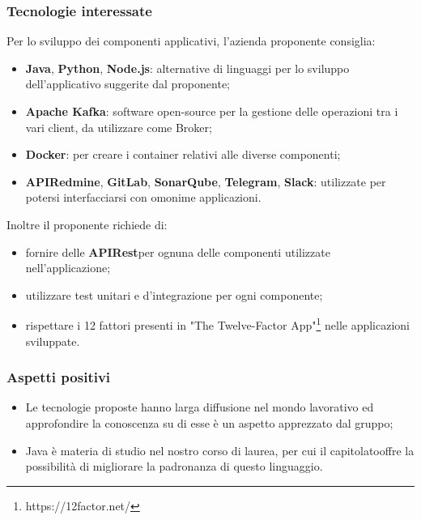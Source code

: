 \subsubsection{Tecnologie interessate}
Per lo sviluppo dei componenti applicativi, l'azienda proponente consiglia:
\begin{itemize}
	\item \textbf{Java}, \textbf{Python}\glo, \textbf{Node.js}\glo: alternative di linguaggi per lo sviluppo dell'applicativo suggerite dal proponente; 
	\item\textbf{Apache Kafka}\glo : software open-source per la gestione delle operazioni tra i vari client, da utilizzare come Broker;
	\item \textbf{Docker}\glo: per creare i container relativi alle diverse componenti;
	\item \textbf{API\glosp Redmine}\glo,  \textbf{GitLab}\glo,  \textbf{SonarQube}\glo,  \textbf{Telegram}\glo, \textbf{Slack}\glo: utilizzate per potersi interfacciarsi con omonime applicazioni.
\end{itemize}
Inoltre il proponente richiede di:
\begin{itemize}
	\item fornire delle \textbf{API\glosp Rest}\glosp per ognuna delle componenti utilizzate nell'applicazione; 
	\item utilizzare test unitari e d'integrazione per ogni componente; 
	\item rispettare i 12 fattori presenti in "The Twelve-Factor App"\footnote{https://12factor.net/} nelle applicazioni sviluppate.
\end{itemize}
\subsubsection{Aspetti positivi}
\begin{itemize}
	\item Le tecnologie proposte hanno larga diffusione nel mondo lavorativo ed
	 approfondire la conoscenza su di esse è un aspetto apprezzato dal gruppo;
	\item Java è materia di studio nel nostro corso di laurea, per cui il
	 capitolato\glosp offre la possibilità di migliorare la padronanza di questo
	 linguaggio.
\end{itemize}

